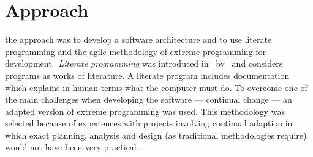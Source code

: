 
\section{Approach}

 the approach was to develop a software
architecture and to use literate programming and the agile methodology of
extreme programming for development.~\emph{Literate programming} was introduced
in~\citeyear{knuth-lp-1984} by~\citeauthor{knuth-lp-1984} and considers programs
as works of literature. A literate program includes documentation which explains
in human terms what the computer must do. To overcome one of the main challenges
when developing the software --- continual change --- an adapted version of
extreme programming was used. This methodology was selected because of
experiences with projects involving continual adaption in which exact planning,
analysis and design (as traditional methodologies require) would not have been
very practical.